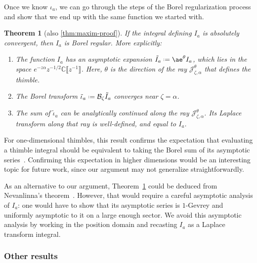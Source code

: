 \documentclass{article}
\newcommand{\C}{\mathbb{C}}
\newcommand{\series}[1]{\tilde{#1}}
\newcommand*{\defeq}{\mathrel{\vcenter{\baselineskip0.5ex \lineskiplimit0pt
                     \hbox{\scriptsize.}\hbox{\scriptsize.}}}%
                     =}
\newcommand{\borel}{\mathcal{B}}
\newcommand{\aexp}{\mathrm{\ae}}
\theoremstyle{definition}
\theoremstyle{plain}
\newtheorem{theorem}{Theorem}[section]
\begin{document}
Once we know $\iota_a$, we can go through the steps of the Borel regularization process and show that we end up with the same function we started with.
\begin{theorem}[also \ref{thm:maxim-proof}]\label{thm:maxim}
If the integral defining $I_a$ is absolutely convergent, then $I_a$ is Borel regular. More explicitly:
\begin{enumerate}
\item\label{part-1} The function $I_a$ has an asymptotic expansion $\series{I}_a \defeq \aexp^\theta I_a$, which lies in the space $e^{-z \alpha} z^{-1/2} \C\llbracket z^{-1}\rrbracket$. Here, $\theta$ is the direction of the ray $\mathcal{J}^\theta_{\zeta, \alpha}$ that defines the thimble.
\item\label{part-2} The Borel transform $\series{\iota}_a \defeq \borel_\zeta \series{I}_a$ converges near $\zeta = \alpha$.
\item\label{part-3} The sum of $\series{\iota}_a$ can be analytically continued along the ray $\mathcal{J}_{\zeta, \alpha}^\theta$. Its Laplace transform along that ray is well-defined, and equal to $I_a$.
\end{enumerate}
\end{theorem}
For one-dimensional thimbles, this result confirms the expectation that evaluating a thimble integral should be equivalent to taking the Borel sum of its asymptotic series~\cite[Section~2]{dunne-unsal}. Confirming this expectation in higher dimensions would be an interesting topic for future work, since our argument may not generalize straightforwardly.

As an alternative to our argument, Theorem~\ref{thm:maxim} could be deduced from Nevanlinna's theorem~\cite{nevanlinna}. However, that would require a careful asymptotic analysis of $I_a$: one would have to show that its asymptotic series is $1$-Gevrey and uniformly asymptotic to it on a large enough sector. We avoid this asymptotic analysis by working in the position domain and recasting $I_a$ as a Laplace transform integral.
%
\subsubsection{Other results}\label{sec:other_results}
%
\end{document}
